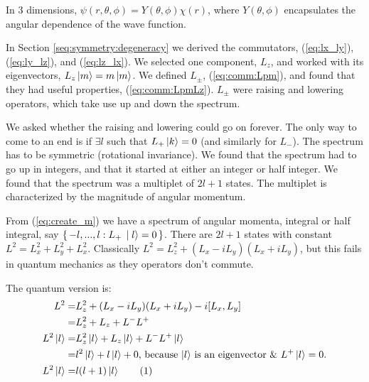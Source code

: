\documentclass[]{article}
\newcommand\numberthis{\addtocounter{equation}{1}\tag{\theequation}}
\begin{document}
In 3 dimensions, $\psi(r,\theta,\phi)= Y(\theta,\phi) \chi(r)$, where $Y(\theta,\phi)$ encapsulates the angular dependence of the wave function.

In Section \ref{seq:symmetry:degeneracy} we derived the commutators, (\ref{eq:lx_ly}), (\ref{eq:ly_lz}), and (\ref{eq:lz_lx}). We selected one component, $L_z$, and worked with its eigenvectors, $L_z \ket{m} = m \ket{m}$. We defined $L_\pm$, (\ref{eq:comm:Lpm}), and found that they had useful properties, (\ref{eq:comm:LpmLz}). $L_\pm$ were raising and lowering operators, which take use up and down the spectrum.

We asked whether the raising and lowering could go on forever. The only way to come to an end is if $\exists l$ such that $L_+\ket{k}=0$ (and similarly for $L_-$). The spectrum has to be symmetric (rotational invariance). We found that the spectrum had to go up in integers, and that it started at either an integer or half integer. We found that the spectrum was a multiplet of $2l+1$ states. The multiplet is characterized by the magnitude of angular momentum.


From (\ref{eq:create_m}) we have a spectrum of angular momenta, integral or half integral, say $\set{-l,...,l:L_+\ket{l}=0}$. There are $2l+1$ states with constant $L^2 = L_x^2 + L_y^2 + L_x^2$. Classically $L^2 = L_z^2 +(L_x-iL_y)(L_x+iL_y)$, but this fails in quantum mechanics as they operators don't commute.

The quantum version is:
\begin{align*}
	L^2 =& L_z^2 +(L_x-iL_y)(L_x+iL_y) -i [L_x,L_y]\\
	=& L_z^2 + L_z + L^-L^+\\
	L^2\ket{l}=& L_z^2\ket{l} + L_z\ket{l} + L^-L^+\ket{l}\\
	=& l^2\ket{l} + l\ket{l} + 0\text{, because $\ket{l}$ is an eigenvector \& $L^+\ket{l}=0$.}\\
	L^2\ket{l}=&l (l+1) \ket{l} \numberthis \label{eq:max:L}
\end{align*}
\end{document}
